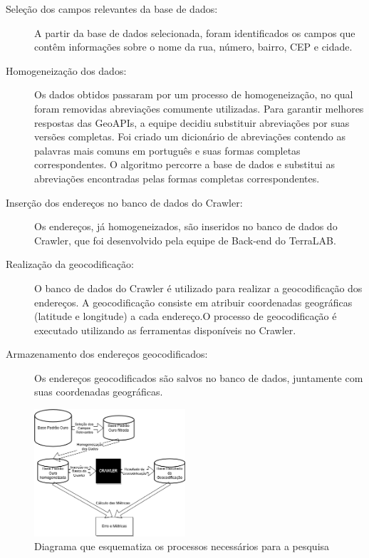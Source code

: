 \documentclass{article}
\begin{document}
\begin{description}
    \item [Seleção dos campos relevantes da base de dados:] A partir da base de dados selecionada, foram identificados os campos que contêm informações sobre o nome da rua, número, bairro, CEP e cidade.
    \item [Homogeneização dos dados:] Os dados obtidos passaram por um processo de homogeneização, no qual foram removidas abreviações comumente utilizadas. Para garantir melhores respostas das GeoAPIs, a equipe decidiu substituir abreviações por suas versões completas. Foi criado um dicionário de abreviações contendo as palavras mais comuns em português e suas formas completas correspondentes. O algoritmo percorre a base de dados e substitui as abreviações encontradas pelas formas completas correspondentes.
    \item [Inserção dos endereços no banco de dados do Crawler:] Os endereços, já homogeneizados, são inseridos no banco de dados do Crawler, que foi desenvolvido pela equipe de Back-end do TerraLAB.
    \item [Realização da geocodificação:] O banco de dados do Crawler é utilizado para realizar a geocodificação dos endereços. A geocodificação consiste em atribuir coordenadas geográficas (latitude e longitude) a cada endereço.O processo de geocodificação é executado utilizando as ferramentas disponíveis no Crawler.
    \item [Armazenamento dos endereços geocodificados:] 
    Os endereços geocodificados são salvos no banco de dados, juntamente com suas coordenadas geográficas.
\end{description}

\begin{figure}[h]
    \centering
    \includegraphics[width=0.5\textwidth]{diagrama monografia.drawio.png}
    \caption{Diagrama que esquematiza os processos necessários para a pesquisa}
    \label{fig:diagramaGeo}
  \end{figure}
\end{document}
